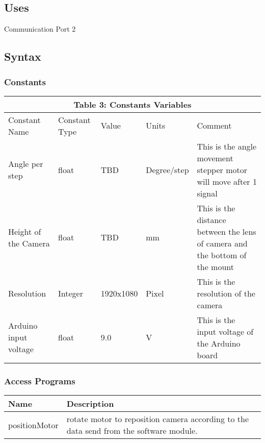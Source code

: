 \documentclass[12pt, titlepage]{article}
\begin{document}
\subsection{Uses}
Communication Port 2

\subsection{Syntax}

\subsubsection{Constants}
\begin{tabular}{|p{}|p{}|p{}|p{}|p{}|}

\hline \multicolumn{5}{|c|}{Table 3: Constants Variables}\\

\hline Constant Name&Constant Type&Value&Units &Comment\\

\hline Angle per step&float&TBD&Degree/step&This is the angle movement stepper motor will move after 1 signal \\

\hline Height of the Camera&float&TBD&mm&This is the distance between the lens of camera and the bottom of the mount\\

\hline Resolution&Integer&1920x1080&Pixel&This is the resolution of the camera\\
\hline Arduino input voltage&float&9.0&V&This is the input voltage of the Arduino board\\


\hline

\end{tabular}


\subsubsection{Access Programs}


\begin{center}
\begin{tabular}{p{4cm} p{8cm} }
\hline
\textbf{Name} & \textbf{Description}  \\
\hline
positionMotor & rotate motor to reposition camera according to the data send from the software module. \\
\hline

\end{tabular}
\end{center}
\end{document}
